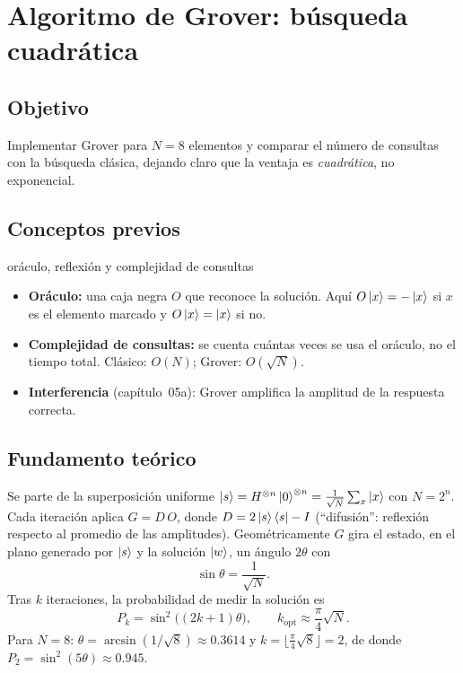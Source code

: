 \def\tituloconcepto{Algoritmo de Grover}


\section{Algoritmo de Grover: búsqueda cuadrática}

\subsection{Objetivo}
Implementar Grover para $N=8$ elementos y comparar el número de consultas con
la búsqueda clásica, dejando claro que la ventaja es \emph{cuadrática}, no
exponencial.

\subsection{Conceptos previos}
\begin{concepto}{oráculo, reflexión y complejidad de consultas}
\begin{itemize}
  \item \textbf{Oráculo:} una caja negra $O$ que reconoce la solución. Aquí
    $O\left|x\right\rangle=-\left|x\right\rangle$ si $x$ es el elemento marcado y $O\left|x\right\rangle=\left|x\right\rangle$ si no.
  \item \textbf{Complejidad de consultas:} se cuenta cuántas veces se usa el
    oráculo, no el tiempo total. Clásico: $O(N)$; Grover: $O(\sqrt N)$.
  \item \textbf{Interferencia} (capítulo~05a): Grover amplifica la amplitud de
    la respuesta correcta.
\end{itemize}
\end{concepto}

\subsection{Fundamento teórico}
Se parte de la superposición uniforme
$\left|s\right\rangle=H^{\otimes n}\left|0\right\rangle^{\otimes n}=\tfrac1{\sqrt N}\sum_x\left|x\right\rangle$ con
$N=2^n$. Cada iteración aplica $G=D\,O$, donde $D=2\left|s\right\rangle\left\langle s\right|-I$
(``difusión'': reflexión respecto al promedio de las amplitudes). Geométricamente
$G$ gira el estado, en el plano generado por $\left|s\right\rangle$ y la solución $\left|w\right\rangle$,
un ángulo $2\theta$ con
\begin{equation}
  \sin\theta=\frac1{\sqrt N}.
\end{equation}
Tras $k$ iteraciones, la probabilidad de medir la solución es
\begin{equation}
  P_k=\sin^2\!\big((2k+1)\theta\big),\qquad
  k_{\text{opt}}\approx\frac\pi4\sqrt N .
\end{equation}
Para $N=8$: $\theta=\arcsin(1/\sqrt8)\approx0.3614$ y
$k=\lfloor\tfrac\pi4\sqrt8\rfloor=2$, de donde
$P_2=\sin^2(5\theta)\approx0.945$.

